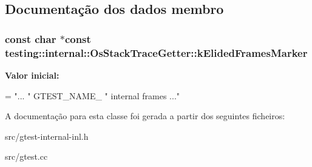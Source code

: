 \subsection{Documentação dos dados membro}
\hypertarget{classtesting_1_1internal_1_1OsStackTraceGetter_aa736c26a4ba2b59a7572e7f44bfe269e}{
\subsubsection[{k\-Elided\-Frames\-Marker}]{\setlength{\rightskip}{0pt plus 5cm}const char $\ast$const testing\-::internal\-::\-Os\-Stack\-Trace\-Getter\-::k\-Elided\-Frames\-Marker\hspace{0.3cm}{\ttfamily [static]}}}\label{classtesting_1_1internal_1_1OsStackTraceGetter_aa736c26a4ba2b59a7572e7f44bfe269e}
{\bfseries Valor inicial\-:}
\begin{DoxyCode}
=
    \textcolor{stringliteral}{"... "} GTEST\_NAME\_ \textcolor{stringliteral}{" internal frames ..."}
\end{DoxyCode}


A documentação para esta classe foi gerada a partir dos seguintes ficheiros\-:\begin{DoxyCompactItemize}
\item 
src/gtest-\/internal-\/inl.\-h\item 
src/gtest.\-cc\end{DoxyCompactItemize}
